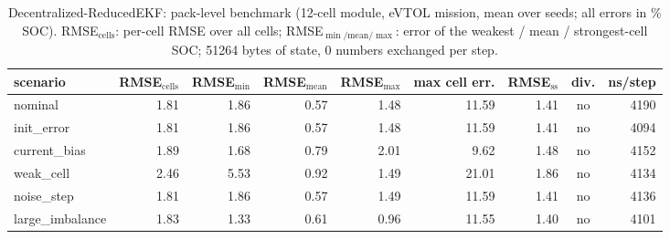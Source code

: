 \begin{table}[H]\centering\footnotesize\setlength{\tabcolsep}{4pt}\caption{Decentralized-ReducedEKF: pack-level benchmark (12-cell module, eVTOL mission, mean over seeds; all errors in \% SOC). RMSE$_\mathrm{cells}$: per-cell RMSE over all cells; RMSE$_{\min/\mathrm{mean}/\max}$: error of the weakest / mean / strongest-cell SOC; 51264 bytes of state, 0 numbers exchanged per step.}\label{tab:pack_DecentralizedReducedEKF}
\begin{tabular}{lrrrrrrcr}\toprule scenario & RMSE$_\mathrm{cells}$ & RMSE$_{\min}$ & RMSE$_\mathrm{mean}$ & RMSE$_{\max}$ & max cell err. & RMSE$_\mathrm{ss}$ & div. & ns/step \\ \midrule
nominal & 1.81 & 1.86 & 0.57 & 1.48 & 11.59 & 1.41 & no & 4190 \\
init\_error & 1.81 & 1.86 & 0.57 & 1.48 & 11.59 & 1.41 & no & 4094 \\
current\_bias & 1.89 & 1.68 & 0.79 & 2.01 & 9.62 & 1.48 & no & 4152 \\
weak\_cell & 2.46 & 5.53 & 0.92 & 1.49 & 21.01 & 1.86 & no & 4134 \\
noise\_step & 1.81 & 1.86 & 0.57 & 1.49 & 11.59 & 1.41 & no & 4136 \\
large\_imbalance & 1.83 & 1.33 & 0.61 & 0.96 & 11.55 & 1.40 & no & 4101 \\
\bottomrule\end{tabular}\end{table}
